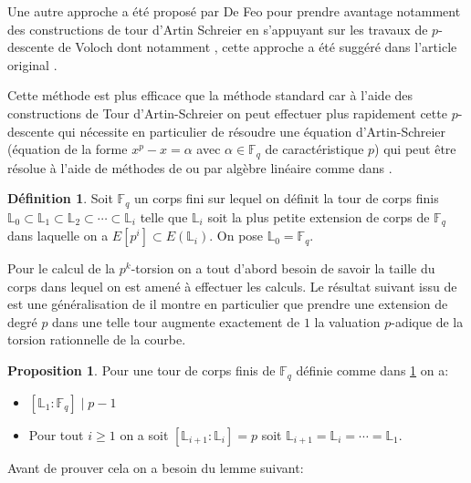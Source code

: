 \documentclass[10pt,a4paper]{book}
\theoremstyle{plain}
\theoremstyle{definition}
\theoremstyle{definition}
\theoremstyle{definition}
\theoremstyle{definition}
\newtheorem{prop}[thm]{Proposition}
\theoremstyle{definition}
\newtheorem{defi}[thm]{Définition}
\theoremstyle{remark}
\theoremstyle{remark}
\theoremstyle{definition}
\begin{document}
Une autre approche a été proposé par De Feo pour prendre avantage notamment des
constructions de tour d'Artin Schreier en s'appuyant sur les travaux de 
$p$-descente de Voloch dont notamment \cite[Lemma 1.1]{Voloch90}, cette 
approche a été suggéré dans l'article original \cite{Couveignes96}. 

Cette méthode est plus efficace que la méthode standard car à l'aide des 
constructions de Tour d'Artin-Schreier on peut effectuer plus rapidement cette 
$p$-descente qui nécessite en particulier de résoudre une équation 
d'Artin-Schreier (équation de la forme $x^p-x=\alpha$ avec $\alpha \in 
\mathbb{F}_q$ de caractéristique $p$) qui peut être résolue à l'aide de 
méthodes de \cite[§6.1]{DeFeo-Shost'12} ou par algèbre linéaire comme dans 
\cite{Couveignes96}. 

\begin{defi}
\label{def:p-adic:level}
Soit $\mathbb{F}_q$ un corps fini sur lequel on définit la tour de corps finis 
$\mathbb{L}_0 \subset  \mathbb{L}_1 \subset \mathbb{L}_2 \subset \cdots \subset
\mathbb{L}_i$ telle que $\mathbb{L}_i$ soit la plus petite extension de corps 
de $\mathbb{F}_q$ dans laquelle on a $E[p^i] \subset E(\mathbb{L}_i)$. On pose 
$\mathbb{L}_0=\mathbb{F}_q$.
\end{defi}

Pour le calcul de la $p^k$-torsion on a tout d'abord besoin de savoir la taille
du corps dans lequel on est amené à effectuer les calculs. %
Le résultat suivant issu de \cite{DeFeo10} est une généralisation de \cite[Proposition 26]{Ler97a} il montre en particulier que prendre une extension de degré $p$ dans une telle tour augmente exactement de $1$ la valuation $p$-adique de la torsion rationnelle de la courbe.

\begin{prop}
\label{pro:ord:fro}
Pour une tour de corps finis de $\mathbb{F}_q$ définie comme dans \ref{def:p-adic:level} on a:
\begin{itemize}
\item $[\mathbb{L}_1:\mathbb{F}_q] \mid p-1$
\item Pour tout $i \geqslant 1$ on a soit $[\mathbb{L}_{i+1}:\mathbb{L}_{i}]=p$ soit $\mathbb{L}_{i+1}=\mathbb{L}_{i}=\cdots = \mathbb{L}_{1}$.
\end{itemize}
\end{prop}

Avant de prouver cela on a besoin du lemme suivant:
\end{document}
